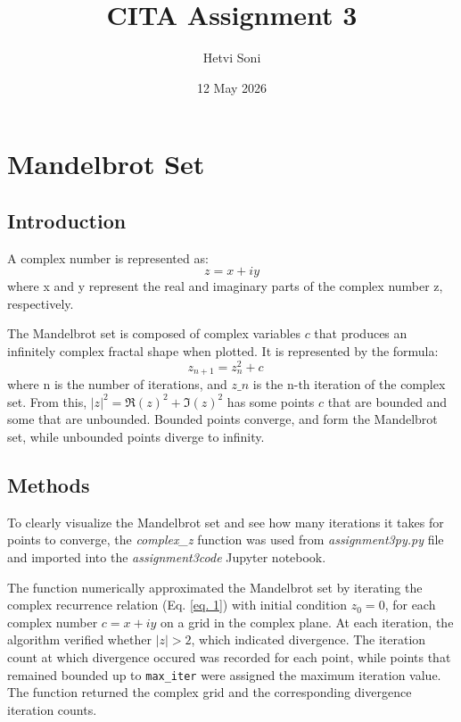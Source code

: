 \documentclass{article}
\title{CITA Assignment 3}
\author{Hetvi Soni}
\date{12 May 2026}
\begin{document}
\maketitle

\section{Mandelbrot Set}
\vspace{-10pt}
\subsection{Introduction}
A complex number is represented as:
\begin{equation}
    z = x + iy
\end{equation}
where x and y represent the real and imaginary parts of the complex number z, respectively.

The Mandelbrot set is composed of complex variables $c$ that produces an infinitely complex fractal shape when plotted. It is represented by the formula:
\begin{equation} \label{eq. 1}
     z_{n+1} = z_n^2 + c \quad
\end{equation}
where n is the number of iterations, and $z\_n$ is the n-th iteration of the complex set. 
From this, $|z|^2 = \mathfrak{R}(z)^2 + \mathfrak{I}(z)^2$ has some points $c$ that are bounded and some that are unbounded. Bounded points converge, and form the Mandelbrot set, while unbounded points diverge to infinity. 

\vspace{-10pt}
\subsection{Methods}
To clearly visualize the Mandelbrot set and see how many iterations it takes for points to converge, the \textit{complex\_z} function was used from \textit{assignment3py.py} file and imported into the \textit{assignment3code
} Jupyter notebook. 

The function numerically approximated the Mandelbrot set by iterating the complex recurrence relation (Eq. \ref{eq. 1}) with initial condition \(z_0 = 0\), for each complex number \(c = x + iy\) on a grid in the complex plane. At each iteration, the algorithm verified whether \(|z| > 2\), which indicated divergence. The iteration count at which divergence occured was recorded for each point, while points that remained bounded up to \texttt{max\_iter} were assigned the maximum iteration value. The function returned the complex grid and the corresponding divergence iteration counts.
\vspace{-10pt}
\end{document}
